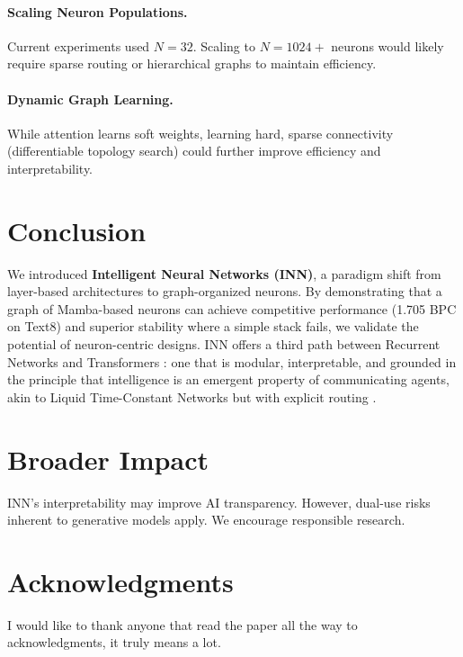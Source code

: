 \documentclass{article}
\begin{document}
\paragraph{Scaling Neuron Populations.} Current experiments used $N=32$. Scaling to $N=1024+$ neurons would likely require sparse routing or hierarchical graphs to maintain efficiency.

\paragraph{Dynamic Graph Learning.} While attention learns soft weights, learning hard, sparse connectivity (differentiable topology search) could further improve efficiency and interpretability.

\section{Conclusion}

We introduced \textbf{Intelligent Neural Networks (INN)}, a paradigm shift from layer-based architectures to graph-organized neurons. By demonstrating that a graph of Mamba-based neurons can achieve competitive performance (1.705 BPC on Text8) and superior stability where a simple stack fails, we validate the potential of neuron-centric designs. INN offers a third path between Recurrent Networks \cite{hochreiter1997long} and Transformers \cite{vaswani2017attention, katharopoulos2020transformers}: one that is modular, interpretable, and grounded in the principle that intelligence is an emergent property of communicating agents, akin to Liquid Time-Constant Networks \cite{hasani2021liquid} but with explicit routing \cite{shazeer2017outrageously}.

\section*{Broader Impact}
INN's interpretability may improve AI transparency. However, dual-use risks inherent to generative models apply. We encourage responsible research.

\section*{Acknowledgments}
I would like to thank anyone that read the paper all the way to acknowledgments, it truly means a lot.



\end{document}

